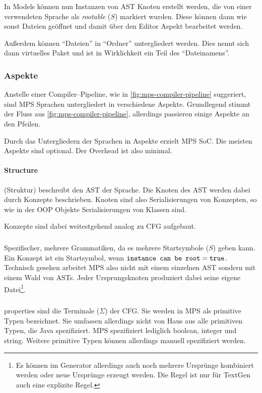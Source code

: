 In Models können nun Instanzen von \ac{AST} Knoten erstellt werden, die von einer verwendeten Sprache als \textit {rootable} ($S$) markiert wurden.
Diese können dann wie sonst Dateien geöffnet und damit über den Editor Aspekt bearbeitet werden.

Außerdem können \enquote{Dateien} in \enquote{Ordner} untergliedert werden.
Dies nennt sich dann virtuelles Paket und ist in Wirklichkeit ein Teil des \enquote{Dateinamens}.

\subsubsection{Aspekte}\label{subsubsec:aspekte}
Anstelle einer Compiler--Pipeline, wie in \autoref{fig:mps-compiler-pipeline} suggeriert, sind \ac{MPS} Sprachen untergliedert in verschiedene Aspekte.
Grundlegend stimmt der Fluss aus \autoref{fig:mps-compiler-pipeline}, allerdings passieren einige Aspekte an den Pfeilen.

Durch das Untergliedern der Sprachen in Aspekte erzielt \ac{MPS} \ac{SoC}.
Die meisten Aspekte sind optional.
Der Overhead ist also minimal.

\paragraph{Structure} (Struktur) beschreibt den \ac{AST} der Sprache.
Die Knoten des \ac{AST} werden dabei durch Konzepte beschrieben.
Knoten sind also Serialisierungen von Konzepten, so wie in der \ac{OOP} Objekte Serialisierungen von Klassen sind.


Konzepte sind dabei weitestgehend analog zu \ac{CFG} aufgebaut.

\subparagraph*{}
Spezifischer, mehrere Grammatiken, da es mehrere Startsymbole ($S$) geben kann.
Ein Konzept ist ein Startsymbol, wenn $\text{\ttfamily instance can be root}=\text{\ttfamily true}$.
Technisch gesehen arbeitet \ac{MPS} also nicht mit einem einzelnen \ac{AST} sondern mit einem Wald von \acp{AST}.
Jeder Ursprungsknoten produziert dabei seine eigene Datei\footnote{Es können im Generator allerdings auch noch mehrere Ursprünge kombiniert werden oder neue Ursprünge erzeugt werden. Die Regel ist nur für TextGen auch eine explizite Regel.}.

\subparagraph*{}
{\ttfamily properties} sind die Terminale ($\Sigma$) der \ac{CFG}.
Sie werden in \ac{MPS} als primitive Typen bezeichnet.
Sie umfassen allerdings nicht von Haus aus alle primitiven Typen, die Java spezifiziert.
\ac{MPS} spezifiziert lediglich {\ttfamily boolean}, {\ttfamily integer} und {\ttfamily string}.
Weitere primitive Typen können allerdings manuell spezifiziert werden.

